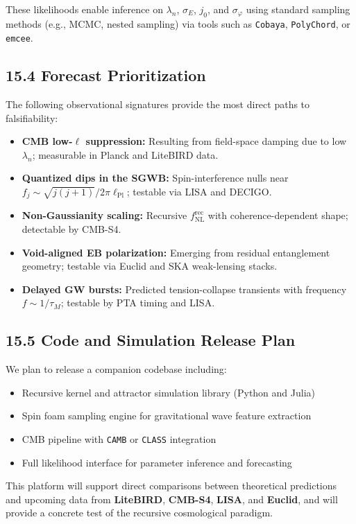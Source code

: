 These likelihoods enable inference on \( \lambda_n \), \( \sigma_E \), \( j_0 \), and \( \sigma_\varphi \) using standard sampling methods (e.g., MCMC, nested sampling) via tools such as \texttt{Cobaya}, \texttt{PolyChord}, or \texttt{emcee}.

\subsection{15.4 Forecast Prioritization}

The following observational signatures provide the most direct paths to falsifiability:

\begin{itemize}
    \item \textbf{CMB low-\( \ell \) suppression:} Resulting from field-space damping due to low \( \lambda_n \); measurable in Planck and LiteBIRD data.
    \item \textbf{Quantized dips in the SGWB:} Spin-interference nulls near \( f_j \sim \sqrt{j(j+1)}/2\pi \ell_{\text{Pl}} \); testable via LISA and DECIGO.
    \item \textbf{Non-Gaussianity scaling:} Recursive \( f_{\text{NL}}^{\text{rec}} \) with coherence-dependent shape; detectable by CMB-S4.
    \item \textbf{Void-aligned EB polarization:} Emerging from residual entanglement geometry; testable via Euclid and SKA weak-lensing stacks.
    \item \textbf{Delayed GW bursts:} Predicted tension-collapse transients with frequency \( f \sim 1/\tau_M \); testable by PTA timing and LISA.
\end{itemize}

\subsection{15.5 Code and Simulation Release Plan}

We plan to release a companion codebase including:

\begin{itemize}
    \item Recursive kernel and attractor simulation library (Python and Julia)
    \item Spin foam sampling engine for gravitational wave feature extraction
    \item CMB pipeline with \texttt{CAMB} or \texttt{CLASS} integration
    \item Full likelihood interface for parameter inference and forecasting
\end{itemize}

This platform will support direct comparisons between theoretical predictions and upcoming data from \textbf{LiteBIRD}, \textbf{CMB-S4}, \textbf{LISA}, and \textbf{Euclid}, and will provide a concrete test of the recursive cosmological paradigm.
